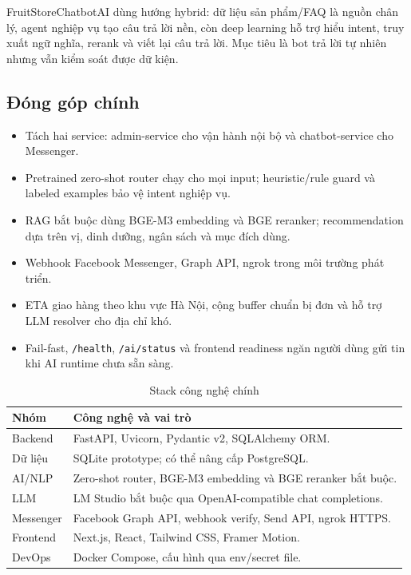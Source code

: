 \documentclass[10pt,a4paper,twocolumn]{article}
\begin{document}
FruitStoreChatbotAI dùng hướng hybrid: dữ liệu sản phẩm/FAQ là nguồn chân lý, agent nghiệp vụ tạo câu trả lời nền, còn deep learning hỗ trợ hiểu intent, truy xuất ngữ nghĩa, rerank và viết lại câu trả lời. Mục tiêu là bot trả lời tự nhiên nhưng vẫn kiểm soát được dữ kiện.

\subsection{Đóng góp chính}
\begin{itemize}
  \item Tách hai service: admin-service cho vận hành nội bộ và chatbot-service cho Messenger.
  \item Pretrained zero-shot router chạy cho mọi input; heuristic/rule guard và labeled examples bảo vệ intent nghiệp vụ.
  \item RAG bắt buộc dùng BGE-M3 embedding và BGE reranker; recommendation dựa trên vị, dinh dưỡng, ngân sách và mục đích dùng.
  \item Webhook Facebook Messenger, Graph API, ngrok trong môi trường phát triển.
  \item ETA giao hàng theo khu vực Hà Nội, cộng buffer chuẩn bị đơn và hỗ trợ LLM resolver cho địa chỉ khó.
  \item Fail-fast, \texttt{/health}, \texttt{/ai/status} và frontend readiness ngăn người dùng gửi tin khi AI runtime chưa sẵn sàng.
\end{itemize}

\begin{table}[H]
\centering
\caption{Stack công nghệ chính}
\label{tab:techstack}
\scriptsize
\begin{tabularx}{\columnwidth}{@{}L{0.22\columnwidth}Y@{}}
\toprule
\textbf{Nhóm} & \textbf{Công nghệ và vai trò} \\
\midrule
Backend & FastAPI, Uvicorn, Pydantic v2, SQLAlchemy ORM. \\
Dữ liệu & SQLite prototype; có thể nâng cấp PostgreSQL. \\
AI/NLP & Zero-shot router, BGE-M3 embedding và BGE reranker bắt buộc. \\
LLM & LM Studio bắt buộc qua OpenAI-compatible chat completions. \\
Messenger & Facebook Graph API, webhook verify, Send API, ngrok HTTPS. \\
Frontend & Next.js, React, Tailwind CSS, Framer Motion. \\
DevOps & Docker Compose, cấu hình qua env/secret file. \\
\bottomrule
\end{tabularx}
\end{table}
\end{document}
